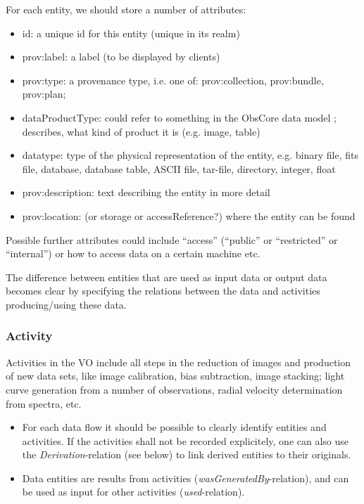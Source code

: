 For each entity, we should store a number of attributes:
\begin{itemize}
\item id: a unique id for this entity (unique in its realm)
\item prov:label: a label (to be displayed by clients)
\item prov:type: a provenance type, i.e. one of: prov:collection, prov:bundle, prov:plan; 
\item dataProductType: could refer to something in the ObsCore data model \citep{std:ObsCore}; describes, what kind of product it is (e.g. image, table)
\item datatype: type of the physical representation of the entity, e.g. binary file, fits file, database, database table, ASCII file, tar-file, directory, integer, float
\item prov:description: text describing the entity in more detail
\item prov:location: (or storage or accessReference?) where the entity can be found
\end{itemize}

Possible further attributes could include  ``access'' (``public'' or ``restricted'' or 
``internal'') or how to access data on a certain machine etc.

The difference between entities that are used as input data or output data 
becomes clear by specifying the relations between the data and activities producing/using these data.

\subsubsection{Activity}
Activities in the VO include all steps in the reduction of images and production of new data sets, like image calibration, bias subtraction, image stacking; light curve generation from a number of observations, radial velocity determination from spectra, etc.

\begin{itemize}
\item For each data flow it should be possible to clearly identify entities and activities. If the activities shall not be recorded explicitely, one can also use the \emph{Derivation}-relation (see below) to link derived entities to their originals.

\item Data entities are results from activities (\emph{wasGeneratedBy}-relation), and can be used as input for other activities (\emph{used}-relation). 

\end{itemize}

